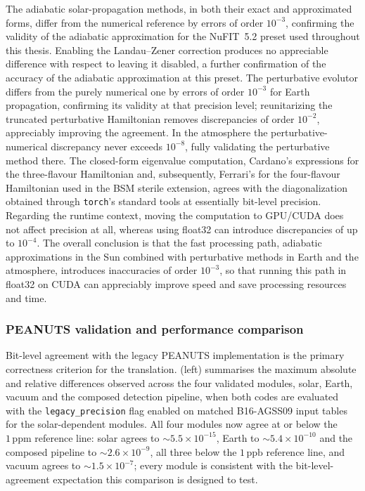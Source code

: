 The adiabatic solar-propagation methods, in both their exact and approximated forms, differ from the numerical reference by errors of order \(10^{-3}\), confirming the validity of the adiabatic approximation for the NuFIT~5.2 preset used throughout this thesis. Enabling the Landau--Zener correction produces no appreciable difference with respect to leaving it disabled, a further confirmation of the accuracy of the adiabatic approximation at this preset. The perturbative evolutor differs from the purely numerical one by errors of order \(10^{-3}\) for Earth propagation, confirming its validity at that precision level; reunitarizing the truncated perturbative Hamiltonian removes discrepancies of order \(10^{-2}\), appreciably improving the agreement. In the atmosphere the perturbative-numerical discrepancy never exceeds \(10^{-8}\), fully validating the perturbative method there. The closed-form eigenvalue computation, Cardano's expressions for the three-flavour Hamiltonian and, subsequently, Ferrari's for the four-flavour Hamiltonian used in the BSM sterile extension, agrees with the diagonalization obtained through \texttt{torch}'s standard tools at essentially bit-level precision. Regarding the runtime context, moving the computation to GPU/CUDA does not affect precision at all, whereas using float32 can introduce discrepancies of up to \(10^{-4}\). The overall conclusion is that the fast processing path, adiabatic approximations in the Sun combined with perturbative methods in Earth and the atmosphere, introduces inaccuracies of order \(10^{-3}\), so that running this path in float32 on CUDA can appreciably improve speed and save processing resources and time.

\subsubsection{PEANUTS validation and performance comparison}
\label{sec:benchmark-results}

Bit-level agreement with the legacy PEANUTS implementation is the primary correctness criterion for the translation.  (left) summarises the maximum absolute and relative differences observed across the four validated modules, solar, Earth, vacuum and the composed detection pipeline, when both codes are evaluated with the \texttt{legacy\_precision} flag enabled on matched B16-AGSS09 input tables for the solar-dependent modules. All four modules now agree at or below the \(1\,\mathrm{ppm}\) reference line: solar agrees to \(\sim5.5\times10^{-15}\), Earth to \(\sim5.4\times10^{-10}\) and the composed pipeline to \(\sim2.6\times10^{-9}\), all three below the \(1\,\mathrm{ppb}\) reference line, and vacuum agrees to \(\sim1.5\times10^{-7}\); every module is consistent with the bit-level-agreement expectation this comparison is designed to test.

